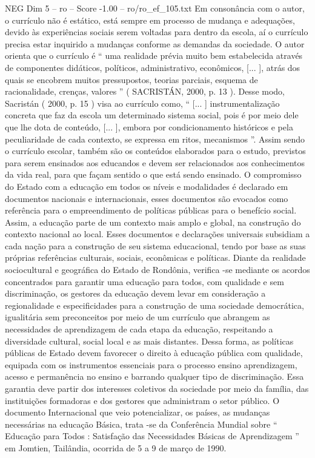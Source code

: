 \begin{textsample}{NEG Dim 5 – ro – Score -1.00 – ro/ro\_ef\_105.txt}
Em consonância com o autor, o currículo não é estático, está sempre em processo de mudança e adequações, devido às experiências sociais serem voltadas para dentro da escola, aí o currículo precisa estar inquirido a mudanças conforme as demandas da sociedade.
O autor orienta que o currículo é “ uma realidade prévia muito bem estabelecida através de componentes didáticos, políticos, administrativo, econômicos, [... ], atrás dos quais se encobrem muitos pressupostos, teorias parciais, esquema de racionalidade, crenças, valores ” ( SACRISTÁN, 2000, p. 13 ).
Desse modo, Sacristán ( 2000, p. 15 ) visa ao currículo como, “ [... ] instrumentalização concreta que faz da escola um determinado sistema social, pois é por meio dele que lhe dota de conteúdo, [... ], embora por condicionamento históricos e pela peculiaridade de cada contexto, se expressa em ritos, mecanismos ”.
Assim sendo o currículo escolar, também são os conteúdos elaborados para o estudo, previstos para serem ensinados aos educandos e devem ser relacionados aos conhecimentos da vida real, para que façam sentido o que está sendo ensinado.
O compromisso do Estado com a educação em todos os níveis e modalidades é declarado em documentos nacionais e internacionais, esses documentos são evocados como referência para o empreendimento de políticas públicas para o benefício social.
Assim, a educação parte de um contexto mais amplo e global, na construção do contexto nacional ao local.
Esses documentos e declarações universais subsidiam a cada nação para a construção de seu sistema educacional, tendo por base as suas próprias referências culturais, sociais, econômicas e políticas.
Diante da realidade sociocultural e geográfica do Estado de Rondônia, verifica -se mediante os acordos concentrados para garantir uma educação para todos, com qualidade e sem discriminação, os gestores da educação devem levar em consideração a regionalidade e especificidades para a construção de uma sociedade democrática, igualitária sem preconceitos por meio de um currículo que abrangem as necessidades de aprendizagem de cada etapa da educação, respeitando a diversidade cultural, social local e as mais distantes.
Dessa forma, as políticas públicas de Estado devem favorecer o direito à educação pública com qualidade, equipada com os instrumentos essenciais para o processo ensino aprendizagem, acesso e permanência no ensino e barrando qualquer tipo de discriminação.
Essa garantia deve partir dos interesses coletivos da sociedade por meio da família, das instituições formadoras e dos gestores que administram o setor público.
O documento Internacional que veio potencializar, os países, as mudanças necessárias na educação Básica, trata -se da Conferência Mundial sobre “ Educação para Todos : Satisfação das Necessidades Básicas de Aprendizagem ” em Jomtien, Tailândia, ocorrida de 5 a 9 de março de 1990.

\end{textsample}
